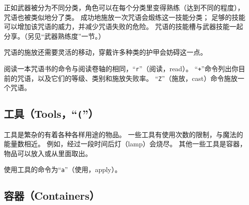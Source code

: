 \documentclass[a4paper, 10pt]{article}
\begin{document}
正如武器被分为不同分类，角色可以在每个分类里变得熟练（达到不同的程度），
咒语也被类似地分了类。
成功地施放一次咒语会煅练这一技能分类；
足够的技能可以增加该咒语的威力，并减少咒语失败的危险。
咒语的技能槽与武器技能一起分享。（另见“武器熟练度”一节。）

咒语的施放还需要灵活的移动，穿戴许多种类的护甲会妨碍这一点。

阅读一本咒语书的命令与阅读卷轴的相同，“{\tt r}”（阅读，read）。
“{\tt +}”命令列出你目前的咒语，以及它们的等级、类别和施放失败率。
“{\tt Z}”（施放，cast）命令施放一个咒语。

\subsection*{工具（Tools，“{\tt (}”）}

工具是繁杂的有着各种各样用途的物品。
一些工具有使用次数的限制，与魔法的能量数相近。
例如，经过一段时间后灯（lamp）会烧尽。
其他一些工具是容器，物品可以放入或从里面取出。

使用工具的命令为“{\tt a}”（使用，apply）。

\subsection*{容器（Containers）}
\end{document}
